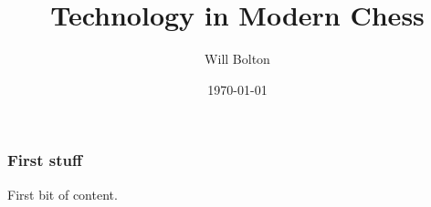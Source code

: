 \documentclass{beamer}
\title[Technology in Modern Chess]{Technology in Modern Chess}
\author{Will Bolton}
\date{\today}
\begin{document}
\titlepage %
\begin{frame} %
\frametitle{First stuff}
First bit of content.
\end{frame}
\end{document}
